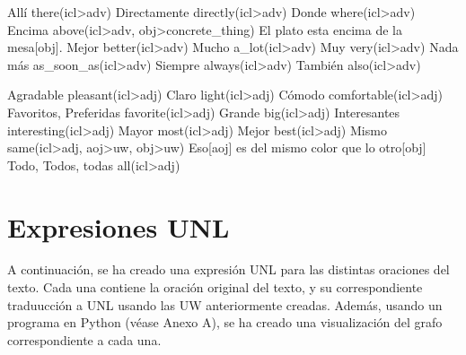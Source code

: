 \documentclass{article}
\begin{document}
{
    \uw
    {Allí}
    {there(icl>adv)}
    {}
    \uw
    {Directamente}
    {directly(icl>adv)}
    {}
    \uw
    {Donde}
    {where(icl>adv)}
    {}
    \uw
    {Encima}
    {above(icl>adv, obj>concrete\_thing)}
    {El plato esta encima de la mesa[obj].}
    \uw
    {Mejor}
    {better(icl>adv)}
    {}
    \uw
    {Mucho}
    {a\_lot(icl>adv)}
    {}
    \uw
    {Muy}
    {very(icl>adv)}
    {}
    \uw
    {Nada más}
    {as\_soon\_as(icl>adv)}
    {}
    \uw
    {Siempre}
    {always(icl>adv)}
    {}
    \uw
    {También}
    {also(icl>adv)}
    {}
}

{
    \uw
    {Agradable}
    {pleasant(icl>adj)}
    {}
    \uw
    {Claro}
    {light(icl>adj)}
    {}
    \uw
    {Cómodo}
    {comfortable(icl>adj)}
    {}
    \uw
    {Favoritos, Preferidas}
    {favorite(icl>adj)}
    {}
    \uw
    {Grande}
    {big(icl>adj)}
    {}
    \uw
    {Interesantes}
    {interesting(icl>adj)}
    {}
    \uw
    {Mayor}
    {most(icl>adj)}
    {}
    \uw
    {Mejor}
    {best(icl>adj)}
    {}
    \uw
    {Mismo}
    {same(icl>adj, aoj>uw, obj>uw)}
    {Eso[aoj] es del mismo color que lo otro[obj]}
    \uw
    {Todo, Todos, todas}
    {all(icl>adj)}
    {}
}

\section{Expresiones UNL}

A continuación, se ha creado una expresión UNL para las distintas oraciones del texto. Cada una contiene la oración original del texto, y su correspondiente traduucción a UNL usando las UW anteriormente creadas. Además, usando un programa en Python (véase Anexo A), se ha creado una visualización del grafo correspondiente a cada una.

\obeylines{}

\obeylines{}
\end{document}
